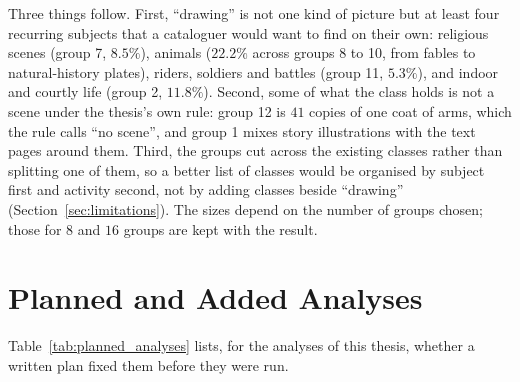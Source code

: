 Three things follow. First, ``drawing'' is not one kind of picture but at least four recurring subjects that a cataloguer would want to find on their own: religious scenes (group 7, $8.5\%$), animals ($22.2\%$ across groups 8 to 10, from fables to natural-history plates), riders, soldiers and battles (group 11, $5.3\%$), and indoor and courtly life (group 2, $11.8\%$). Second, some of what the class holds is not a scene under the thesis's own rule: group 12 is $41$ copies of one coat of arms, which the rule calls ``no scene'', and group 1 mixes story illustrations with the text pages around them. Third, the groups cut across the existing classes rather than splitting one of them, so a better list of classes would be organised by subject first and activity second, not by adding classes beside ``drawing'' (Section~\ref{sec:limitations}). The sizes depend on the number of groups chosen; those for $8$ and $16$ groups are kept with the result.

\clearpage
\section{Planned and Added Analyses}
\label{sec:planned_analyses}

Table~\ref{tab:planned_analyses} lists, for the analyses of this thesis, whether a written plan fixed them before they were run.

